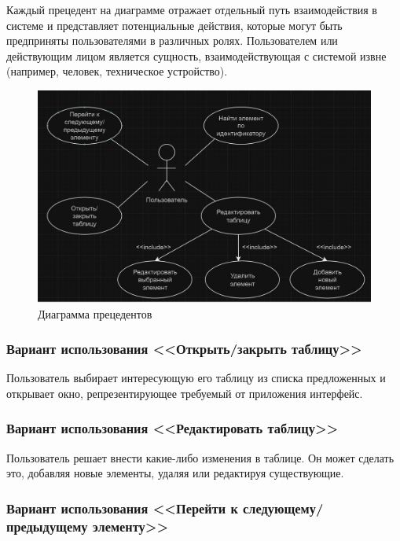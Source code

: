 Каждый прецедент на диаграмме отражает отдельный путь взаимодействия в системе и представляет потенциальные действия, которые могут быть предприняты пользователями в различных ролях. Пользователем или действующим лицом является сущность, взаимодействующая с системой извне (например, человек, техническое устройство).

\begin{figure}
	\centering
	\includegraphics[width=1\linewidth]{images/CommonScheme2}
	\caption{Диаграмма прецедентов}
	\label{fig:commonscheme2}
\end{figure}

\subsubsection{Вариант использования <<Открыть/закрыть таблицу>>}

Пользователь выбирает интересующую его таблицу из списка предложенных и открывает окно, репрезентирующее требуемый от приложения интерфейс.

\subsubsection{Вариант использования <<Редактировать таблицу>>}

Пользователь решает внести какие-либо изменения в таблице. Он может сделать это, добавляя новые элементы, удаляя или редактируя существующие.

\subsubsection{Вариант использования <<Перейти к следующему/предыдущему элементу>>}

